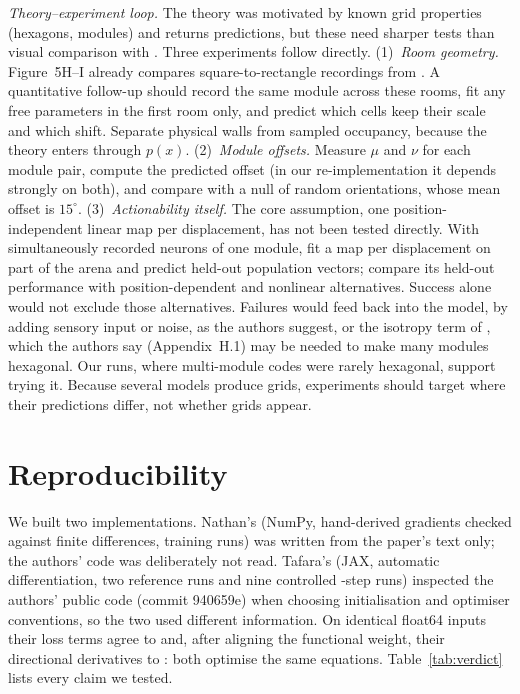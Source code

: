 \documentclass[10pt,letterpaper]{article}
\begin{document}
\emph{Theory--experiment loop.} The theory was motivated by known grid properties (hexagons, modules) and returns predictions, but these need sharper tests than visual comparison with \citet{stensola2012}. Three experiments follow directly. (1)~\emph{Room geometry.} Figure~5H--I already compares square-to-rectangle recordings from \citet{stensola2012}. A quantitative follow-up should record the same module across these rooms, fit any free parameters in the first room only, and predict which cells keep their scale and which shift. Separate physical walls from sampled occupancy, because the theory enters through $p(x)$. (2)~\emph{Module offsets.} Measure $\mu$ and $\nu$ for each module pair, compute the predicted offset (in our re-implementation it depends strongly on both), and compare with a null of random orientations, whose mean offset is $15^\circ$. (3)~\emph{Actionability itself.} The core assumption, one position-independent linear map per displacement, has not been tested directly. With simultaneously recorded neurons of one module, fit a map per displacement on part of the arena and predict held-out population vectors; compare its held-out performance with position-dependent and nonlinear alternatives. Success alone would not exclude those alternatives. Failures would feed back into the model, by adding sensory input or noise, as the authors suggest, or the isotropy term of \citet{gao2021}, which the authors say (Appendix~H.1) may be needed to make many modules hexagonal. Our runs, where multi-module codes were rarely hexagonal, support trying it. Because several models produce grids, experiments should target where their predictions differ, not whether grids appear.

\section{Reproducibility}
We built two implementations. Nathan's (NumPy, hand-derived gradients checked against finite differences, \nJobs{} training runs) was written from the paper's text only; the authors' code was deliberately not read. Tafara's (JAX, automatic differentiation, two reference runs and nine controlled \jDiagSteps-step runs) inspected the authors' public code (commit 940659e) when choosing initialisation and optimiser conventions, so the two used different information. On identical float64 inputs their loss terms agree to \auditLoss{} and, after aligning the functional weight, their directional derivatives to \auditGrad{}: both optimise the same equations. Table~\ref{tab:verdict} lists every claim we tested.
\end{document}
